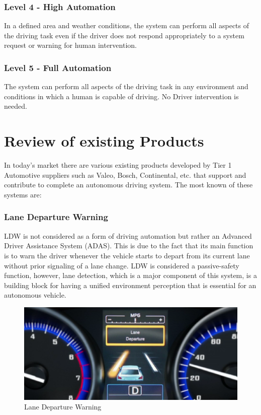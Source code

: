 \subsubsection{Level 4 - High Automation}
In a defined area and weather conditions, the system can perform all aspects of the driving task even if the driver does not respond appropriately to a system request or warning for human intervention.
\subsubsection{Level 5 - Full Automation}
The system can perform all aspects of the driving task in any environment and conditions in which a human is capable of driving. No Driver intervention is needed.
\section{Review of existing Products}
In today's market there are various existing products developed by Tier 1 Automotive suppliers such as Valeo, Bosch, Continental, etc. that support and contribute to complete an autonomous driving system. The most known of these systems are: 
\subsubsection{Lane Departure Warning}
LDW is not considered as a form of driving automation but rather an Advanced Driver Assistance System (ADAS). This is due to the fact that its main function is to warn the driver whenever the vehicle starts to depart from its current lane without prior signaling of a lane change. LDW is considered a passive-safety function, however, lane detection, which is a major component of this system, is a building block for having a unified environment perception that is essential for an autonomous vehicle.
\begin{figure}[h]
\includegraphics[width=0.6\linewidth]{Figures/LDW.png}
\centering
\caption{Lane Departure Warning}
\end{figure}

